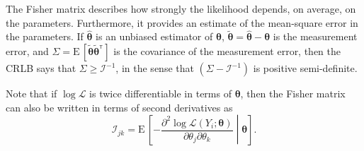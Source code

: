 \documentclass[amsmath,amssymb,aps,prx,reprint,nopreprintnumbers,nofootinbib]{revtex4-1}
\newcommand\transpose{\ensuremath{^{^\mathsf{T}}}}
\begin{document}
The Fisher matrix describes how strongly the likelihood depends, on average, on the parameters. Furthermore, it provides an estimate of the mean-square error in the parameters. If $\hat{\bm\theta}$ is an unbiased estimator of $\bm\theta$, $\tilde{\bm\theta} = \hat{\bm\theta} - \bm\theta$ is the measurement error, and $\Sigma = \mathrm{E} \, [\tilde{\bm\theta}\tilde{\bm\theta}\transpose]$ is the covariance of the measurement error, then the \ac{CRLB} says that $\Sigma \geq \mathcal{I}^{-1}$, in the sense that $\left(\Sigma - \mathcal{I}^{-1}\right)$ is positive semi\nobreakdashes-definite.

Note that if $\log\mathcal{L}$ is twice differentiable in terms of $\bm\theta$, then the Fisher matrix can also be written in terms of second derivatives as
%
\begin{equation}\label{eq:general-fisher-matrix-second-derivatives}
    \mathcal{I}_{jk} = \mathrm{E} \, \left[
        -\frac{\partial^2 \log
            \mathcal{L}(Y_i ; \bm\theta)}
            {\partial \theta_j \partial \theta_k}
    \middle| \bm\theta
    \right].
\end{equation}
\end{document}

